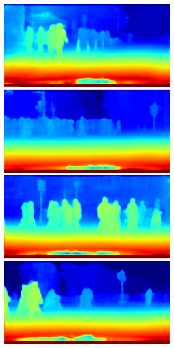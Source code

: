 \begin{figure}[p]
{{\begin{subfigure}[t]{0.24\linewidth}
\begin{center}
		\includegraphics[width=\linewidth,trim={0px 60px 0 0px},clip]{results/segnet_204_output_4.png}
		\includegraphics[width=\linewidth,trim={0px 60px 0 0px},clip]{results/segnet_149_output_4.png}
		\includegraphics[width=\linewidth,trim={0px 60px 0 0px},clip]{results/segnet_128_output_4.png}
		\includegraphics[width=\linewidth,trim={0px 60px 0 0px},clip]{results/segnet_114_output_4.png}

\end{center}
\end{subfigure}}}
\end{figure}
